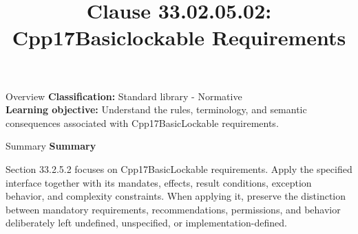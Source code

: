 \documentclass[10pt,letterpaper]{article}
\title{Clause 33.02.05.02: Cpp17Basiclockable Requirements}
\author{}
\date{}
\begin{document}
\maketitle
\begin{CornellOverviewBox}{Overview}
\textbf{Classification:} Standard library - Normative\\[2pt]
\textbf{Learning objective:} Understand the rules, terminology, and semantic consequences associated with Cpp17BasicLockable requirements.
\end{CornellOverviewBox}\begin{CornellSummaryBox}{Summary}
{\sffamily\bfseries\color{Accent} Summary}\par\vspace{3pt}Section 33.2.5.2 focuses on Cpp17BasicLockable requirements. Apply the specified interface together with its mandates, effects, result conditions, exception behavior, and complexity constraints. When applying it, preserve the distinction between mandatory requirements, recommendations, permissions, and behavior deliberately left undefined, unspecified, or implementation-defined.
\end{CornellSummaryBox}
\end{document}
